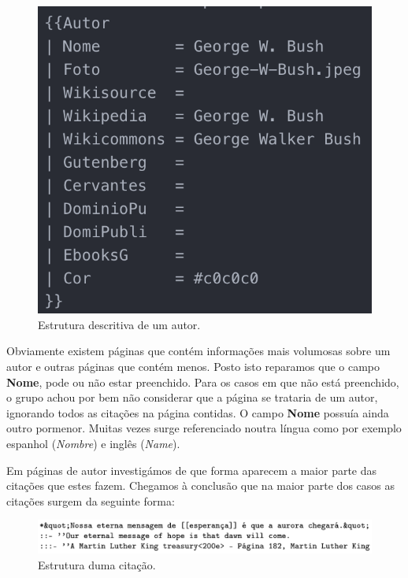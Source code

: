 \documentclass[11pt,a4paper]{report}
\begin{document}
\begin{figure}[H]
\centering
\includegraphics[scale=0.75]{pagina_autor.png}
\caption{Estrutura descritiva de um autor.}
\label{img:pagina_autor}
\end{figure}

Obviamente existem páginas que contém informações mais volumosas sobre um autor e outras páginas que contém menos. Posto isto reparamos que o campo \textbf{Nome}, pode ou não estar preenchido. Para os casos em que não está preenchido, o grupo achou por bem não considerar que a página se trataria de um autor, ignorando todos as citações na página contidas. O campo \textbf{Nome} possuía ainda outro pormenor. Muitas vezes surge referenciado noutra língua como por exemplo espanhol (\emph{Nombre}) e inglês (\emph{Name}).

Em páginas de autor investigámos de que forma aparecem a maior parte das citações que estes fazem. Chegamos à conclusão que na maior parte dos casos as citações surgem da seguinte forma:

\begin{figure}[H]
\centering
\includegraphics[scale=0.75]{quote.png}
\caption{Estrutura duma citação.}
\label{img:quote}
\end{figure}
\end{document}
